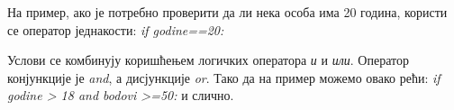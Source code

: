На пример, ако је потребно проверити да ли нека особа има 20 година, користи се оператор једнакости: \emph{if godine==20:}

Услови се комбинују коришћењем логичких оператора \emph{и} и \emph{или}. Оператор конјункције је \emph{and}, а дисјункције \emph{or}. Тако да на пример можемо овако рећи: \emph{if godine > 18 and bodovi >=50:} и слично.

